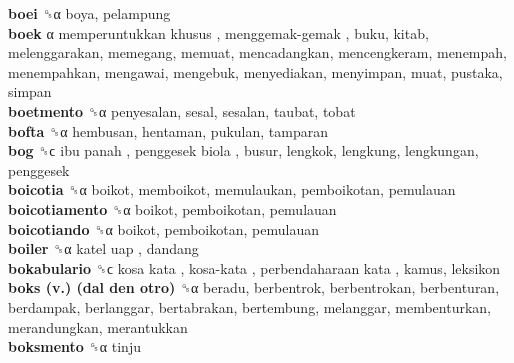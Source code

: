 \textbf{boei} ␝α  boya, pelampung  \\
\textbf{boek} α   memperuntukkan khusus ,  menggemak-gemak , buku, kitab, melenggarakan, memegang, memuat, mencadangkan, mencengkeram, menempah, menempahkan, mengawai, mengebuk, menyediakan, menyimpan, muat, pustaka, simpan  \\
\textbf{boetmento} ␝α  penyesalan, sesal, sesalan, taubat, tobat  \\
\textbf{bofta} ␝α  hembusan, hentaman, pukulan, tamparan  \\
\textbf{bog} ␝ϲ   ibu panah ,  penggesek biola , busur, lengkok, lengkung, lengkungan, penggesek  \\
\textbf{boicotia} ␝α  boikot, memboikot, memulaukan, pemboikotan, pemulauan  \\
\textbf{boicotiamento} ␝α  boikot, pemboikotan, pemulauan  \\
\textbf{boicotiando} ␝α  boikot, pemboikotan, pemulauan  \\
\textbf{boiler} ␝α   katel uap , dandang  \\
\textbf{bokabulario} ␝ϲ   kosa kata ,  kosa-kata ,  perbendaharaan kata , kamus, leksikon  \\
\textbf{boks (v.) (dal den otro)} ␝α  beradu, berbentrok, berbentrokan, berbenturan, berdampak, berlanggar, bertabrakan, bertembung, melanggar, membenturkan, merandungkan, merantukkan  \\
\textbf{boksmento} ␝α  tinju  \\
